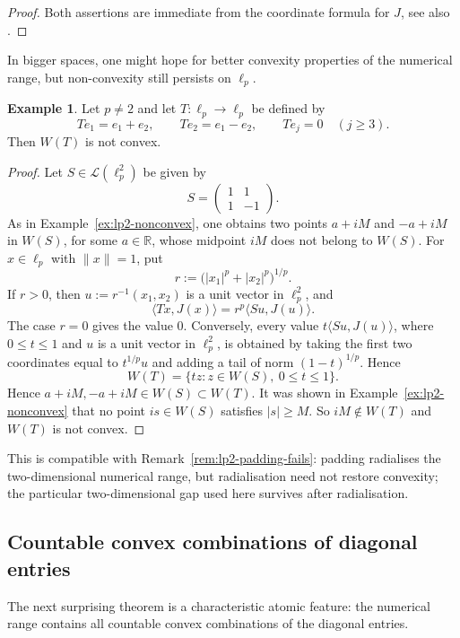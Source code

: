 \documentclass[11pt]{amsart}
\numberwithin{equation}{section}
\theoremstyle{definition}
\newtheorem{example}[theorem]{Example}
\theoremstyle{remark}
\newcommand{\R}{\mathbb{R}}
\begin{document}
\begin{proof}
Both assertions are immediate from the coordinate formula for $J$, see also
\cite[Theorems~2.16 and~4.14]{Cio}.
\end{proof}

In bigger spaces, one might hope for better convexity properties of the numerical range, but non-convexity still persists on $\ell_p$.

\begin{example}\label{ex:nonconvex-infinite-ellp}
Let $p\ne 2$ and let $T:\ell_p\to\ell_p$ be defined by
\[
Te_1=e_1+e_2,
\qquad
Te_2=e_1-e_2,
\qquad
Te_j=0 \quad (j\ge 3).
\]
Then $W(T)$ is not convex.
\end{example}


\begin{proof}
Let $S \in \mathcal L(\ell_p^2)$ be given by
\[
S=
\begin{pmatrix}
1&1\\
1&-1
\end{pmatrix}.
\]
 As in Example~\ref{ex:lp2-nonconvex}, one obtains two points $a+iM$ and $-a+iM$ in $W(S)$, for some $a\in\R$, whose midpoint $iM$ does not belong to $W(S)$.
For $x\in\ell_p$ with $\|x\|=1$, put
\[
        r:=\bigl(|x_1|^p+|x_2|^p\bigr)^{1/p}.
\]
If $r>0$, then $u:=r^{-1}(x_1,x_2)$ is a unit vector in $\ell_p^2$, and
\[
        \langle Tx,J(x)\rangle
        = r^p\langle Su,J(u)\rangle.
\]
The case $r=0$ gives the value $0$. Conversely, every value
$t\langle Su,J(u)\rangle$, where $0\le t\le1$ and $u$ is a unit vector in
$\ell_p^2$, is obtained by taking the first two coordinates equal to
$t^{1/p}u$ and adding a tail of norm $(1-t)^{1/p}$. Hence
\[
W(T)=\{tz:z\in W(S),\ 0\le t\le 1\}.
\]
 Hence $a+iM,-a+iM\in W(S)\subset W(T)$. It was shown in Example~\ref{ex:lp2-nonconvex} that
no point $is \in W(S)$ satisfies $|s| \ge M.$
So $iM\notin W(T)$ and $W(T)$ is not convex.
\end{proof}
This is compatible with Remark~\ref{rem:lp2-padding-fails}: padding radialises
the two-dimensional numerical range, but radialisation need not restore
convexity; the particular two-dimensional gap used here survives after
radialisation.


\subsection{Countable convex combinations of diagonal entries}

The next surprising theorem is a characteristic atomic feature: the numerical range contains all countable convex combinations of the diagonal entries.
\end{document}
